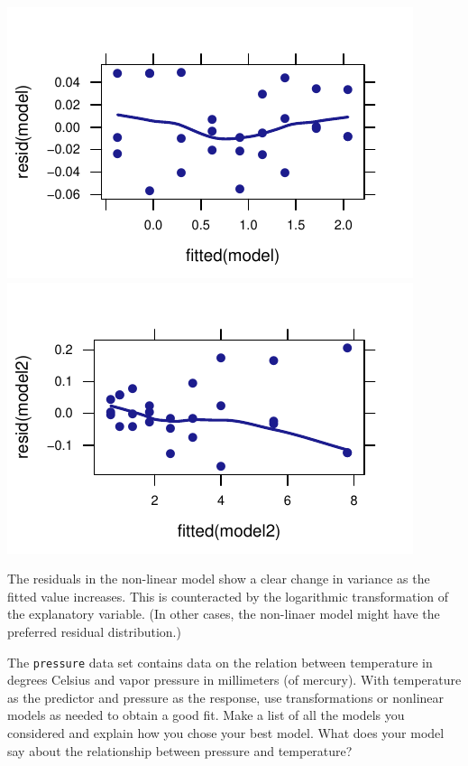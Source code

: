 \documentclass[twoside]{book}\usepackage[]{graphicx}\usepackage[]{xcolor}
\makeatletter
\def\maxwidth{ %
  \ifdim\Gin@nat@width>\linewidth
    \linewidth
  \else
    \Gin@nat@width
  \fi
}
\newenvironment{knitrout}{}{} %
\newcommand{\Rindex}[1]{\index{\texttt{#1}}}
\newcommand{\dataframe}[1]{{\color{blue!80!black}\texttt{#1}}\Rindex{#1}}
\makeatother
\begin{document}
\begin{solution}
\begin{knitrout}
{\centering \includegraphics[width=\maxwidth]{figures/fig-unnamed-chunk-212-1} 
\includegraphics[width=\maxwidth]{figures/fig-unnamed-chunk-212-2} 

}



\end{knitrout}
	
	The residuals in the non-linear model show a clear change 
	in variance as the fitted value increases.  This is counteracted by the logarithmic
	transformation of the explanatory variable.  (In other cases, the non-linaer model
	might have the preferred residual distribution.)
\end{solution}



\begin{problem}
The \dataframe{pressure} data set contains 
data on the relation between temperature in degrees Celsius and 
vapor pressure in millimeters (of mercury).
With temperature as the predictor and pressure as the response,
use transformations or nonlinear models as needed to obtain a good fit.
Make a list of all the models you considered and explain
how you chose your best model.
What does your model say about the relationship between 
pressure and temperature?
\end{problem}
\end{document}
